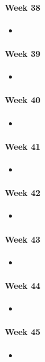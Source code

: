 \paragraph{Week 38}
\begin{itemize}
    \item 
\end{itemize}
\paragraph{Week 39}
\begin{itemize}
    \item 
\end{itemize}
\paragraph{Week 40}
\begin{itemize}
    \item 
\end{itemize}
\paragraph{Week 41}
\begin{itemize}
    \item 
\end{itemize}
\paragraph{Week 42}
\begin{itemize}
    \item 
\end{itemize}
\paragraph{Week 43}
\begin{itemize}
    \item 
\end{itemize}
\paragraph{Week 44}
\begin{itemize}
    \item 
\end{itemize}
\paragraph{Week 45}
\begin{itemize}
    \item 
\end{itemize}

